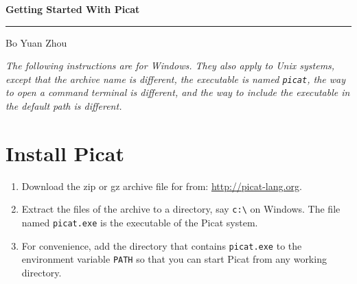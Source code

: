 \documentclass{article}[12pt]
\newcommand{\ignore}[1]{}
\begin{document}
\begin{center}
\textbf{\huge{Getting Started With Picat}}\\
\end{center}
\rule{450pt}{1pt}

\vspace*{5mm}
\begin{center}
{\Large Bo Yuan Zhou}
\end{center}

\vspace*{5mm}

\noindent
\textit{The following instructions are for Windows. They also apply to Unix systems, except that the archive name is different, the executable is named \texttt{picat}, the way to open a command terminal is different, and the way to include the executable in the default path is different.}
  
\section*{\Large{Install Picat}}
\begin{enumerate}
\item Download the zip or gz archive file for from: \url{http://picat-lang.org}. 
\item Extract the files of the archive to a directory, say \verb+c:\+ on Windows. The file named \verb+picat.exe+ is the executable of the Picat system.
\item For convenience, add the directory that contains \verb+picat.exe+ to the environment variable \texttt{PATH} so that you can start Picat from any working directory. 
  \ignore{
Please refer to the following Web page for instructions for updating environment variables.
\begin{tabbing}
aa \= aaa \= aaa \= aaa \= aaa \= aaa \= aaa \kill
\> \> \verb+http://www.itechtalk.com/thread3595.html+ 
\end{tabbing}
Once you're finished, the directory that you are in should look like this:
\\
\\
\texttt{[image: tutorial\_2.jpg]}
\\
}
\end{enumerate}
    
\end{document}
